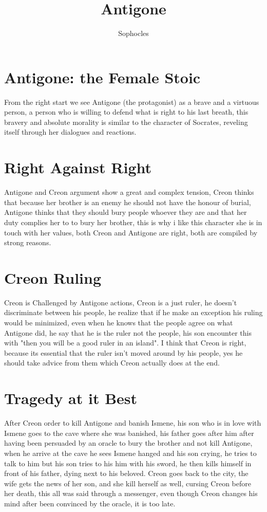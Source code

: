 \documentclass[12pt, a4paper]{article}
\title{Antigone}
\author{Sophocles}
\date{}
\begin{document}
\maketitle

\section*{Antigone: the Female Stoic}

{\fontpar
From the right start we see Antigone (the protagonist) as a brave
and a virtuous person, a person who is willing to defend what is right
to his last breath, this bravery and absolute morality is similar to the
character of Socrates, reveling itself through her dialogues and reactions. 

}

\section*{Right Against Right}

{\fontpar
Antigone and Creon argument show a great and complex tension,
Creon thinks that because her
brother is an enemy he should not have the honour of burial, Antigone
thinks that they should bury people whoever they are and that her duty
complies her to to bury her brother, this is why i like this character
she is in touch with her values, both Creon and Antigone are right, both
are compiled by strong reasons.
}

 \section*{Creon Ruling}

{\fontpar
Creon is Challenged by Antigone actions, Creon is a just ruler,
he doesn't discriminate between his people, he realize that if he 
make an exception his ruling would be minimized, even when he knows that
the people agree on what Antigone did, he say that he is the ruler not 
the people, his son encounter this with "then you will be a good ruler in 
an island".
I think that Creon is right, because its  essential that the ruler 
isn't moved around by his people, yes he should take advice from them which Creon actually does at the end.
} 

\section*{Tragedy at it Best}

{\fontpar
After Creon order to kill Antigone and banish Ismene, his son who is 
in love with Ismene goes to the cave where she was banished, his father
goes after him after having been persuaded by an oracle to bury the brother
and not kill Antigone, when he arrive at the cave he sees Ismene hanged
and his son crying, he tries to talk to him but his son tries to his him
with his sword, he then kills himself in front of his father, dying next
to his beloved. Creon goes back to the city, the wife gets the news of her
son, and she kill herself as well, cursing Creon before her death, this
all was said through a messenger, even though Creon changes his mind after
been convinced by the oracle, it is too late.

}
\end{document}

